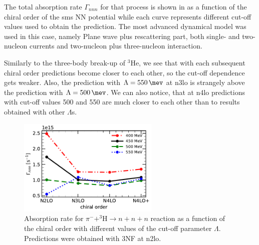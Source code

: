     The total absorption rate $\Gamma_{nnn}$ for that process is shown in 
    as a function of the chiral order of the \gls{sms} NN potential while each curve represents
    different cut-off values used to obtain the prediction. 
    The most advanced dynamical model was used in this case, namely Plane wave plus rescattering part,
    both single- and two-nucleon currents and two-nucleon plus three-nucleon interaction.

    Similarly to the three-body break-up of $^3$He, we see that with each subsequent chiral order
    predictions become closer to each other, so the cut-off dependence gets weaker.
    Also, the prediction with $\Lambda=\SI{550}{\mev}$ at \gls{n3lo} is
    strangely above the prediction with $\Lambda=\SI{500}{\mev}$.
    We can also notice, that at \gls{n4lo}
    predictions with cut-off values \SI{500}{\mev} and \SI{550}{\mev}
    are much closer to each other than to results obtained with other $\Lambda$s.

    \begin{figure}[h]
        \begin{center}
        \includegraphics[width=0.6\textwidth]{PlotData/PION/Dalitz_maps/figures/Gamma_nnn.pdf}
        \end{center}
        \caption{Absorption rate for $\pi^- + ^3\text{H} \rightarrow n + n + n$ reaction as a function
        of the chiral order with different values of the cut-off parameter $\Lambda$.
        Predictions were obtained with 3NF at \gls{n2lo}.}
        \label{Gamma_nnn}
    \end{figure}

